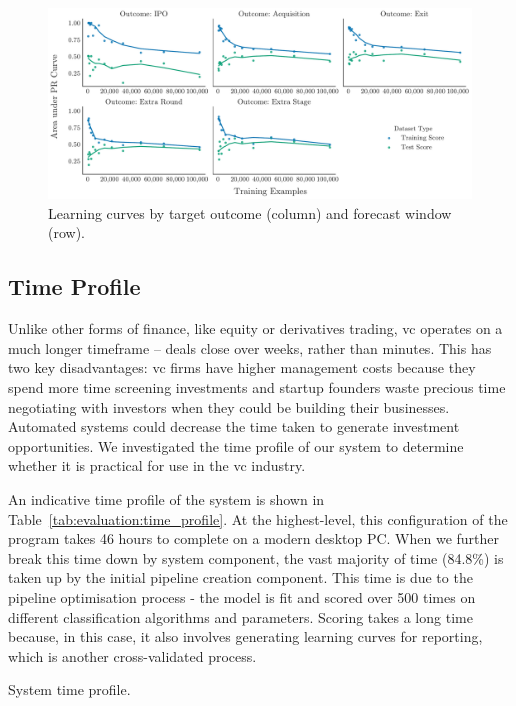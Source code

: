 \documentclass[../thesis/thesis.tex]{subfiles}
\begin{document}
\begin{figure}[!htb]
    \centering
    \includegraphics[width=\textwidth]{../figures/evaluation/learning_curves_outcome}
    \caption[Learning curves by target outcome]{Learning curves by target outcome (column) and forecast window (row).}
    \label{fig:evaluation:learning_outcome_window}
\end{figure}

\subsection{Time Profile}

Unlike other forms of finance, like equity or derivatives trading, \gls{vc} operates on a much longer timeframe -- deals close over weeks, rather than minutes. This has two key disadvantages: \gls{vc} firms have higher management costs because they spend more time screening investments and startup founders waste precious time negotiating with investors when they could be building their businesses. Automated systems could decrease the time taken to generate investment opportunities. We investigated the time profile of our system to determine whether it is practical for use in the \gls{vc} industry.

An indicative time profile of the system is shown in Table~\ref{tab:evaluation:time_profile}. At the highest-level, this configuration of the program takes 46 hours to complete on a modern desktop PC. When we further break this time down by system component, the vast majority of time (84.8\%) is taken up by the initial pipeline creation component. This time is due to the pipeline optimisation process - the model is fit and scored over 500 times on different classification algorithms and parameters. Scoring takes a long time because, in this case, it also involves generating learning curves for reporting, which is another cross-validated process.

\begin{table}[!htb]
    \centering
    \scalebox{0.9}{}
    \caption[System time profile]{System time profile.}
    \label{tab:evaluation:time_profile}
\end{table}
\end{document}
